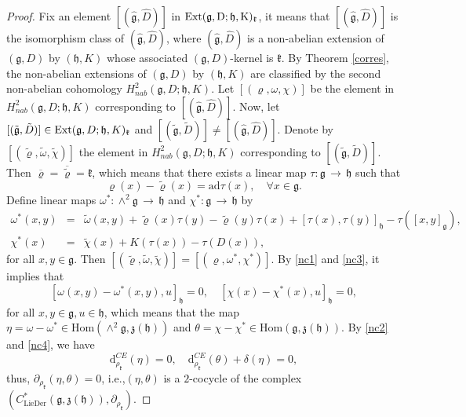 \documentclass[12pt]{amsart}
\newcommand{\lon }{\,\rightarrow\,}
\newcommand{\g}{\mathfrak g}
\newcommand{\h}{\mathfrak h}
\newcommand{\frkk}{\mathfrak k}
\newcommand{\frkz}{\mathfrak z}
\newcommand{\dM}{\mathrm{d}}
\newcommand{\Hom}{\mathrm{Hom}}
\newcommand{\ad}{\mathrm{ad}}
\begin{document}
    \begin{proof}
Fix an element $[(\hat{\g}, \hat{D})]$ in $\rm{Ext}(\g, D;\h,K)_\frkk$, it means that $[(\hat{\g}, \hat{D})]$ is the isomorphism class of $(\hat{\g}, \hat{D})$, where $(\hat{\g}, \hat{D})$ is a non-abelian extension of $(\g,D)$ by $(\h,K)$
whose associated $(\g, D)$-kernel is $\frkk$. 
By Theorem \ref{corres}, the non-abelian extensions of $(\g, D)$ by $(\h, K)$ are classified by the second non-abelian cohomology $H^2_{nab}(\g,D; \h,K)$. Let $[(\varrho, \omega, \chi)]$ be the element in $H^{2}_{nab}(\g, D;\h,K)$ corresponding to $[(\hat{\g}, \hat{D})]$. Now, let $[(\tilde{\g}, \tilde{D})]\in{\rm Ext}(\g, D;\h,K)_\frkk$ and $[(\tilde{\g}, \tilde{D})]\neq [(\hat{\g}, \hat{D})]$. Denote by $[(\tilde{\varrho}, \tilde{\omega}, \tilde{\chi})]$ the element in $H^{2}_{nab}(\g,D; \h,K)$ corresponding to $[(\tilde{\g}, \tilde{D})]$. Then $\overline{\varrho}=\overline{\tilde{\varrho}}=\frkk$, which means that there exists a linear map $\tau:\g\lon\h$ such that
$$\varrho(x)-\tilde{\varrho}(x)=\ad\tau(x), \quad \forall x\in\g.$$
Define linear maps $\omega^*:\wedge^2\g\lon\h$ and $\chi^*:\g\lon\h$ by
\begin{eqnarray}
\label{H1}\omega^*(x, y)&=&\tilde{\omega}(x, y)+\tilde{\varrho}(x)\tau(y)-\tilde{\varrho}(y)\tau(x)+[\tau(x), \tau(y)]_\h-\tau([x, y]_\g),\\
\label{H2}\chi^*(x)&=&\tilde{\chi}(x)+K(\tau(x))-\tau(D(x)),
\end{eqnarray}
for all $x, y\in\g$. Then $[(\tilde{\varrho}, \tilde{\omega}, \tilde{\chi})]=[(\varrho, \omega^*, \chi^*)]$. By \eqref{nc1} and \eqref{nc3}, it implies that
$$
[\omega(x, y)-\omega^*(x, y), u]_\h=0,\quad [\chi(x)-\chi^*(x), u]_\h=0,
$$
for all $x, y\in\g, u\in\h$,
which means that the map $\eta=\omega-\omega^*\in\Hom(\wedge^2\g, \frkz(\h))$ and $\theta=\chi-\chi^*\in\Hom(\g, \frkz(\h))$. By \eqref{nc2} and \eqref{nc4}, we have
$$
\dM^{CE}_{\rho_\frkk}(\eta)=0, \quad \dM^{CE}_{\rho_\frkk}(\theta)+\delta(\eta)=0,
$$
thus, $\partial_{\rho_\frkk}(\eta, \theta)=0$, i.e.,$(\eta, \theta)$ is a $2$-cocycle of the complex $(C^{*}_{\mathrm{LieDer}}(\g, \frkz(\h)), \partial_{\rho_\frkk})$. 


\end{proof}
\end{document}
